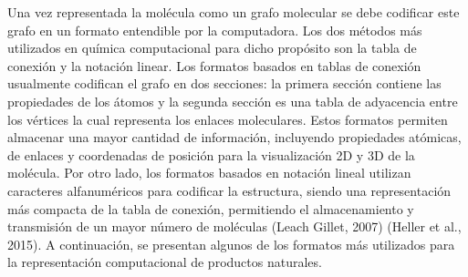 Una vez representada la molécula como un grafo molecular se debe codificar este grafo en un formato entendible por la computadora. Los dos métodos más utilizados en química computacional para dicho propósito son la tabla de conexión y la notación linear. Los formatos basados en tablas de conexión usualmente codifican el grafo en dos secciones: la primera sección contiene las propiedades de los átomos y la segunda sección es una tabla de adyacencia entre los vértices la cual representa los enlaces moleculares. Estos formatos permiten almacenar una mayor cantidad de información, incluyendo propiedades atómicas, de enlaces y coordenadas de posición para la visualización 2D y 3D de la molécula. Por otro lado, los formatos basados en notación lineal utilizan caracteres alfanuméricos para codificar la estructura, siendo una representación más compacta de la tabla de conexión, permitiendo el almacenamiento y transmisión de un mayor número de moléculas (Leach Gillet, 2007) (Heller et al., 2015). A continuación, se presentan algunos de los formatos más utilizados para la representación computacional de productos naturales.

